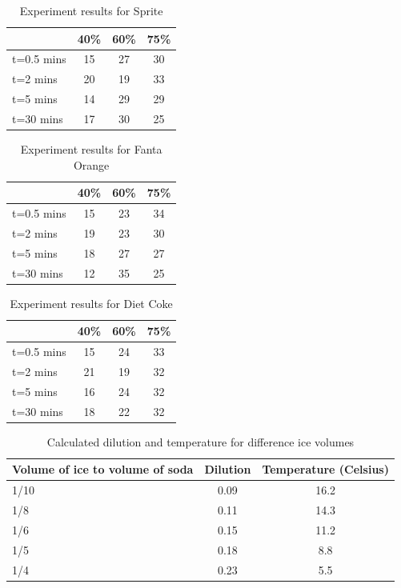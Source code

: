 \documentclass[oneside,12pt]{report}
\begin{document}
\begin{table}[ h]
\centering
\begin{tabular}{ l || c|c|c }
  &40\% &60\% & 75\%  \\
\hline  
t=0.5 mins & 15 & 27 & 30\\ 
\hline  
t=2 mins & 20 & 19 & 33\\ 
\hline  
t=5 mins & 14 & 29 & 29\\ 
\hline  
t=30 mins & 17 & 30 & 25\\ 
\hline  
   
 \end{tabular}

\caption{Experiment results for Sprite}

\end{table}
\begin{table}[ h]
\centering
\begin{tabular}{ l || c|c|c }
  &40\% &60\% & 75\%  \\
\hline  
t=0.5 mins & 15 & 23 & 34\\ 
\hline  
t=2 mins & 19 & 23 & 30\\ 
\hline  
t=5 mins & 18 & 27 & 27\\ 
\hline  
t=30 mins & 12 & 35 & 25\\ 
\hline  
   
 \end{tabular}

\caption{Experiment results for Fanta Orange}

\end{table}
\begin{table}[ h]
\centering
\begin{tabular}{ l || c|c|c }
  &40\% &60\% & 75\%  \\
\hline  
t=0.5 mins & 15 & 24 & 33\\ 
\hline  
t=2 mins & 21& 19 & 32\\ 
\hline  
t=5 mins & 16 & 24 & 32\\ 
\hline  
t=30 mins & 18 & 22& 32\\ 
\hline  
   
 \end{tabular}

\caption{Experiment results for Diet Coke}

\end{table}
\begin{table}[ h]
\centering
\begin{tabular}{ l || c|c}
 Volume of ice to volume of soda &Dilution &Temperature (Celsius) \\
\hline  
1/10 & 0.09&16.2\\ 
\hline  
1/8 & 0.11&14.3\\ 
\hline 
1/6 & 0.15&11.2\\ 
\hline 
1/5 & 0.18&8.8\\ 
\hline 
1/4 & 0.23&5.5\\ 
\hline    
\end{tabular}
\caption{Calculated dilution and temperature for difference ice volumes}
\end{table}
\end{document}
